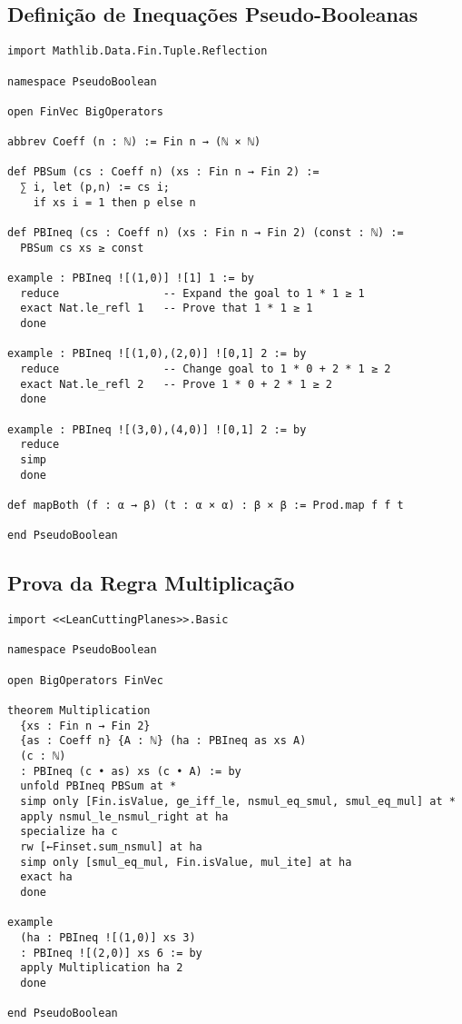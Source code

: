 \documentclass[conference]{IEEEtran}
\begin{document}
\newpage
\onecolumn
\appendix

\subsection{Definição de Inequações Pseudo-Booleanas}
\begin{verbatim}
import Mathlib.Data.Fin.Tuple.Reflection

namespace PseudoBoolean

open FinVec BigOperators

abbrev Coeff (n : ℕ) := Fin n → (ℕ × ℕ)

def PBSum (cs : Coeff n) (xs : Fin n → Fin 2) :=
  ∑ i, let (p,n) := cs i;
    if xs i = 1 then p else n

def PBIneq (cs : Coeff n) (xs : Fin n → Fin 2) (const : ℕ) :=
  PBSum cs xs ≥ const

example : PBIneq ![(1,0)] ![1] 1 := by
  reduce                -- Expand the goal to 1 * 1 ≥ 1
  exact Nat.le_refl 1   -- Prove that 1 * 1 ≥ 1
  done

example : PBIneq ![(1,0),(2,0)] ![0,1] 2 := by
  reduce                -- Change goal to 1 * 0 + 2 * 1 ≥ 2
  exact Nat.le_refl 2   -- Prove 1 * 0 + 2 * 1 ≥ 2
  done

example : PBIneq ![(3,0),(4,0)] ![0,1] 2 := by
  reduce
  simp
  done

def mapBoth (f : α → β) (t : α × α) : β × β := Prod.map f f t

end PseudoBoolean
\end{verbatim}
\newpage

\subsection{Prova da Regra Multiplicação}
\begin{verbatim}
import <<LeanCuttingPlanes>>.Basic

namespace PseudoBoolean

open BigOperators FinVec

theorem Multiplication
  {xs : Fin n → Fin 2}
  {as : Coeff n} {A : ℕ} (ha : PBIneq as xs A)
  (c : ℕ)
  : PBIneq (c • as) xs (c • A) := by
  unfold PBIneq PBSum at *
  simp only [Fin.isValue, ge_iff_le, nsmul_eq_smul, smul_eq_mul] at *
  apply nsmul_le_nsmul_right at ha
  specialize ha c
  rw [←Finset.sum_nsmul] at ha
  simp only [smul_eq_mul, Fin.isValue, mul_ite] at ha
  exact ha
  done

example
  (ha : PBIneq ![(1,0)] xs 3)
  : PBIneq ![(2,0)] xs 6 := by
  apply Multiplication ha 2
  done

end PseudoBoolean
\end{verbatim}
\newpage
\end{document}
